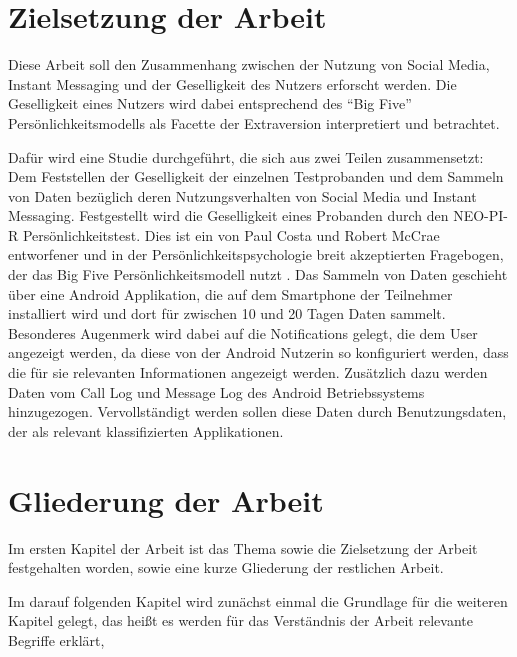 \section{Zielsetzung der Arbeit}
\label{ch:Einleitung:sec:Zielsetzung}

Diese Arbeit soll den Zusammenhang zwischen der Nutzung von Social Media, Instant Messaging und der Geselligkeit des Nutzers erforscht werden.
Die Geselligkeit eines Nutzers wird dabei entsprechend des "`Big Five"' Persönlichkeitsmodells als Facette der Extraversion interpretiert und betrachtet.

Dafür wird eine Studie durchgeführt, die sich aus zwei Teilen zusammensetzt:
Dem Feststellen der Geselligkeit der einzelnen Testprobanden und dem Sammeln von Daten bezüglich deren Nutzungsverhalten von Social Media und Instant Messaging. 
Festgestellt wird die Geselligkeit eines Probanden durch den NEO-PI-R Persönlichkeitstest.
Dies ist ein von Paul Costa und Robert McCrae entworfener und in der Persönlichkeitspsychologie breit akzeptierten Fragebogen, der das Big Five Persönlichkeitsmodell nutzt \cite{costa1992neo}.
Das Sammeln von Daten geschieht über eine Android Applikation, die auf dem Smartphone der Teilnehmer installiert wird und dort für zwischen 10 und 20 Tagen Daten sammelt.
Besonderes Augenmerk wird dabei auf die Notifications gelegt, die dem User angezeigt werden, da diese von der Android Nutzerin so konfiguriert werden, dass die für sie relevanten Informationen angezeigt werden.
Zusätzlich dazu werden Daten vom Call Log und Message Log des Android Betriebssystems hinzugezogen.
Vervollständigt werden sollen diese Daten durch Benutzungsdaten, der als relevant klassifizierten Applikationen.


\section{Gliederung der Arbeit}
\label{ch:Einleitung:sec:Gliederung}

Im ersten Kapitel der Arbeit ist das Thema sowie die Zielsetzung der Arbeit festgehalten worden, sowie eine kurze Gliederung der restlichen Arbeit.
\par

Im darauf folgenden Kapitel wird zunächst einmal die Grundlage für die weiteren Kapitel gelegt, das heißt
es werden für das Verständnis der Arbeit relevante Begriffe erklärt, 
\par

